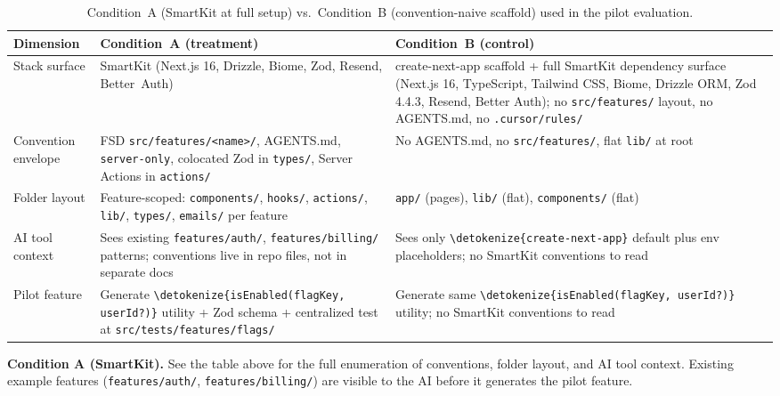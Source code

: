 \documentclass[12pt,a4paper]{report}
\newcommand{\code}[1]{\texttt{\nolinkurl{\detokenize{#1}}}}
\newcommand{\pkg}[1]{\texttt{\nolinkurl{#1}}}
\DeclareRobustCommand{\filename}[1]{\bgroup\urlstyle{tt}\nolinkurl{#1}\egroup}
\begin{document}
\begin{table}[H]
\centering
\small
\renewcommand{\arraystretch}{1.2}
\caption{Condition~A (SmartKit at full setup) vs.\ Condition~B (convention-naive scaffold) used in the pilot evaluation.}
\label{tbl:condition-ab}
\begin{tabular}{@{}p{2.6cm}p{5.6cm}p{5.6cm}@{}}
\toprule
\textbf{Dimension} & \textbf{Condition~A (treatment)} & \textbf{Condition~B (control)} \\
\midrule
Stack surface
  & SmartKit (Next.js 16, Drizzle, Biome, Zod, Resend, Better~Auth)
  & create-next-app scaffold + full SmartKit dependency surface (Next.js 16, TypeScript, Tailwind CSS, Biome, Drizzle ORM, Zod 4.4.3, Resend, Better Auth); no \filename{src/features/} layout, no AGENTS.md, no \filename{.cursor/rules/} \\[4pt]
\midrule
Convention envelope
  & FSD \filename{src/features/<name>/}, AGENTS.md, \pkg{server-only}, colocated Zod in \filename{types/}, Server Actions in \filename{actions/}
  & No AGENTS.md, no \filename{src/features/}, flat \filename{lib/} at root \\[4pt]
\midrule
Folder layout
  & Feature-scoped: \filename{components/}, \filename{hooks/}, \filename{actions/}, \filename{lib/}, \filename{types/}, \filename{emails/} per feature
  & \filename{app/} (pages), \filename{lib/} (flat), \filename{components/} (flat) \\[4pt]
\midrule
AI tool context
  & Sees existing \filename{features/auth/}, \filename{features/billing/} patterns; conventions live in repo files, not in separate docs
  & Sees only \code{create-next-app} default plus env placeholders; no SmartKit conventions to read \\[4pt]
\midrule
Pilot feature
  & Generate \code{isEnabled(flagKey, userId?)} utility + Zod schema + centralized test at \filename{src/tests/features/flags/}
  & Generate same \code{isEnabled(flagKey, userId?)} utility; no SmartKit conventions to read \\[4pt]
\bottomrule
\end{tabular}
\renewcommand{\arraystretch}{1}
\end{table}



\medskip\noindent\textbf{Condition A (SmartKit).} See the table above for the full enumeration of conventions, folder layout, and AI tool context. Existing example features (\filename{features/auth/}, \filename{features/billing/}) are visible to the AI before it generates the pilot feature.
\end{document}
